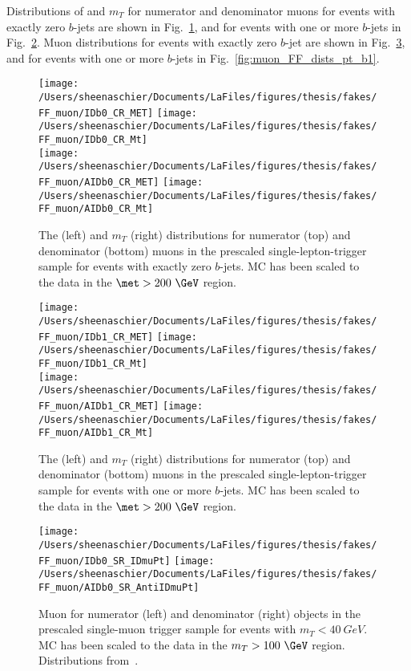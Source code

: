 \documentclass[11pt, oneside]{article}   	%
\begin{document}
Distributions of \met{} and $m_{T}$ for numerator and denominator muons for events with exactly zero $b$-jets are shown in Fig.~\ref{fig:muon_FF_dists_b0}, and for events with one or more $b$-jets in Fig.~\ref{fig:muon_FF_dists_b1}.  Muon \pt{} distributions for events with exactly zero $b$-jet are shown in Fig.~\ref{fig:muon_FF_dists_pt_b0}, and for events with one or more $b$-jets in Fig.~\ref{fig:muon_FF_dists_pt_b1}.

\begin{figure}[tbp]
  \centering
  \texttt{[image: /Users/sheenaschier/Documents/LaFiles/figures/thesis/fakes/FF\_muon/IDb0\_CR\_MET]}
  \texttt{[image: /Users/sheenaschier/Documents/LaFiles/figures/thesis/fakes/FF\_muon/IDb0\_CR\_Mt]}\\
  \texttt{[image: /Users/sheenaschier/Documents/LaFiles/figures/thesis/fakes/FF\_muon/AIDb0\_CR\_MET]}
  \texttt{[image: /Users/sheenaschier/Documents/LaFiles/figures/thesis/fakes/FF\_muon/AIDb0\_CR\_Mt]}
  \caption{The \met{} (left) and  $m_{T}$ (right) distributions for numerator (top) and denominator (bottom) muons in the prescaled single-lepton-trigger sample for events with exactly zero $b$-jets.  MC has been scaled to the data in the $\met > 200~\GeV$ region.}
  \label{fig:muon_FF_dists_b0}
\end{figure}

\begin{figure}[tbp]
  \centering
  \texttt{[image: /Users/sheenaschier/Documents/LaFiles/figures/thesis/fakes/FF\_muon/IDb1\_CR\_MET]}
  \texttt{[image: /Users/sheenaschier/Documents/LaFiles/figures/thesis/fakes/FF\_muon/IDb1\_CR\_Mt]}\\
  \texttt{[image: /Users/sheenaschier/Documents/LaFiles/figures/thesis/fakes/FF\_muon/AIDb1\_CR\_MET]}
  \texttt{[image: /Users/sheenaschier/Documents/LaFiles/figures/thesis/fakes/FF\_muon/AIDb1\_CR\_Mt]}
  \caption{The \met{} (left) and $m_{T}$ (right) distributions for numerator (top) and denominator (bottom) muons in the prescaled single-lepton-trigger sample for events with one or more $b$-jets.  MC has been scaled to the data in the $\met > 200~\GeV$ region.}
  \label{fig:muon_FF_dists_b1}
\end{figure}

\begin{figure}[tbp]
  \centering
  \texttt{[image: /Users/sheenaschier/Documents/LaFiles/figures/thesis/fakes/FF\_muon/IDb0\_SR\_IDmuPt]}
  \texttt{[image: /Users/sheenaschier/Documents/LaFiles/figures/thesis/fakes/FF\_muon/AIDb0\_SR\_AntiIDmuPt]}
  \caption{Muon \pt{} for numerator (left) and denominator (right) objects in the prescaled single-muon trigger sample for events with $m_{T} < 40~ GeV$.  MC has been scaled to the data in the $m_{T} > 100~\GeV$ region. Distributions from~\cite{Boerner:2231917}.}
  \label{fig:muon_FF_dists_pt_b0}
\end{figure}
\end{document}
